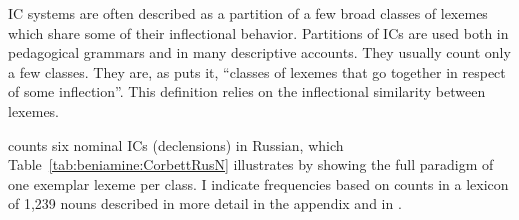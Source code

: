 \documentclass[output=paper]{langscibook}
\begin{document}
    IC systems are often described as a partition of a few broad classes of lexemes which share some of their inflectional behavior. Partitions of ICs are used both in pedagogical grammars and in many descriptive accounts. They usually count only a few classes. They are, as \citet[129]{Matthews1991} puts it, ``classes of lexemes that go together in respect of some inflection''. This definition relies on the inflectional similarity between lexemes.

    \citet{Corbett1982} counts six nominal ICs (declensions) in Russian, which Table~\ref{tab:beniamine:CorbettRusN} illustrates by showing the full paradigm of one exemplar lexeme per class. I indicate frequencies based on counts in a lexicon of 1,239 nouns \citep{BeniamineBrown2019} described in more detail in the appendix and in \cite{BeniaminePhd}.
\end{document}
